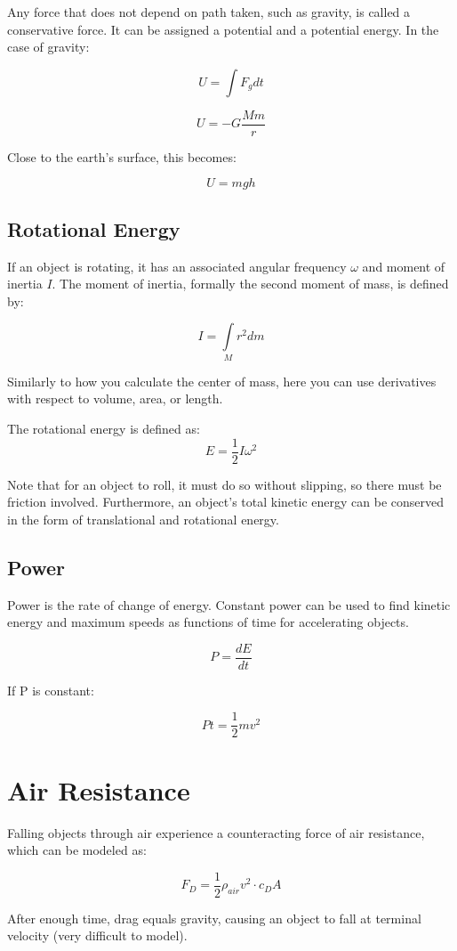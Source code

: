 \documentclass{article}
\begin{document}
Any force that does not depend on path taken, such as gravity, is called a conservative force. It can be assigned a potential and a potential energy. In the case of gravity:

$$U=\int F_g dt$$

$$U=-G\frac{Mm}{r}$$

Close to the earth's surface, this becomes:

$$U=mgh$$

\subsection{Rotational Energy}

If an object is rotating, it has an associated angular frequency $\omega$ and moment of inertia $I$. The moment of inertia, formally the second moment of mass, is defined by:

$$I=\int\limits_{M} r^2 dm $$

Similarly to how you calculate the center of mass, here you can use derivatives with respect to volume, area, or length.

The rotational energy is defined as:
$$E=\frac{1}{2}I\omega^2$$

Note that for an object to roll, it must do so without slipping, so there must be friction involved. Furthermore, an object's total kinetic energy can be conserved in the form of translational and rotational energy.

\subsection{Power}

Power is the rate of change of energy. Constant power can be used to find kinetic energy and maximum speeds as functions of time for accelerating objects.

$$P=\frac{dE}{dt}$$

If P is constant:

$$Pt=\frac{1}{2}mv^2$$

\section{Air Resistance}

Falling objects through air experience a counteracting force of air resistance, which can be modeled as:

$$F_D=\frac{1}{2}\rho_{air} v^2 \cdot c_D A$$

After enough time, drag equals gravity, causing an object to fall at terminal velocity (very difficult to model).
\end{document}
